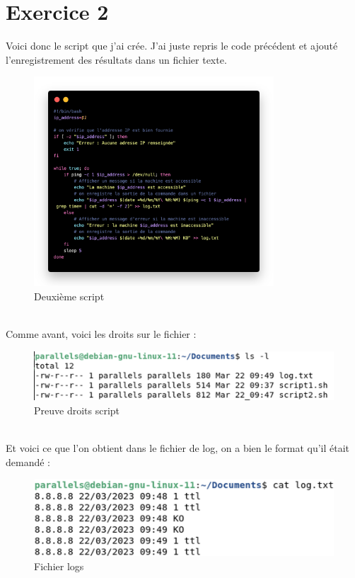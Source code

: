 \documentclass[12pt, a4paper]{article}
\begin{document}
\section{Exercice 2}
Voici donc le script que j'ai crée. J'ai juste repris le code précédent et 
ajouté l'enregistrement des résultats dans un fichier texte. 
\begin{figure}[h]
    \centering
    \includegraphics[width=0.8\textwidth]{img/code2.png}
    \caption{Deuxième script}
    \label{fig:script3}
\end{figure}\\
Comme avant, voici les droits sur le fichier : 
\begin{figure}[h]
    \centering
    \includegraphics[width=1\textwidth]{img/preuve2.png}
    \caption{Preuve droits script}
    \label{fig:script4}
\end{figure}\\
\newpage
Et voici ce que l'on obtient dans le fichier de log, on a bien 
le format qu'il était demandé : 
\begin{figure}[h]
    \centering
    \includegraphics[width=1\textwidth]{img/log.png}
    \caption{Fichier logs}
    \label{fig:script5}
\end{figure}\\
\end{document}
